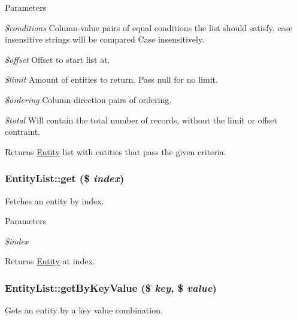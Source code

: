 \begin{DoxyParams}{Parameters}
\item[{\em \$conditions}]Column-\/value pairs of equal conditions the list should satisfy. case insensitive strings will be compared Case insensitively. \item[{\em \$offset}]Offset to start list at. \item[{\em \$limit}]Amount of entities to return. Pass null for no limit. \item[{\em \$ordering}]Column-\/direction pairs of ordering. \item[{\em \$total}]Will contain the total number of records, without the limit or offset contraint.\end{DoxyParams}
\begin{DoxyReturn}{Returns}
\hyperlink{classEntity}{Entity} list with entities that pass the given criteria. 
\end{DoxyReturn}
\hypertarget{classEntityList_a74b902eba1e67bc6133c923a02540b37}{
\subsubsection[{get}]{\setlength{\rightskip}{0pt plus 5cm}EntityList::get (\$ {\em index})}}
\label{classEntityList_a74b902eba1e67bc6133c923a02540b37}
Fetches an entity by index.


\begin{DoxyParams}{Parameters}
\item[{\em \$index}]\end{DoxyParams}
\begin{DoxyReturn}{Returns}
\hyperlink{classEntity}{Entity} at index. 
\end{DoxyReturn}
\hypertarget{classEntityList_a172772d052d7fc9407c1646a504c9a57}{
\subsubsection[{getByKeyValue}]{\setlength{\rightskip}{0pt plus 5cm}EntityList::getByKeyValue (\$ {\em key}, \/  \$ {\em value})}}
\label{classEntityList_a172772d052d7fc9407c1646a504c9a57}
Gets an entity by a key value combination.


